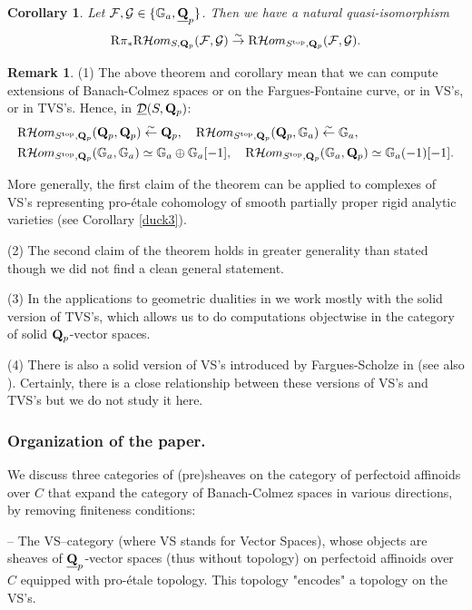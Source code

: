 \documentclass[10pt]{amsart}
\let\cal\mathcal
\newtheorem{corollary}[equation]{Corollary}
\theoremstyle{definition}
\newtheorem{remark}[equation]{Remark}
\theoremstyle{remark}
\newcommand{\Hhom}{{\cal Hom}}
\newcommand{\sff}{{\mathcal{F}}}
\newcommand{\sg}{{\mathcal{G}}}
\newcommand{\sd}{{\mathcal{D}}}
\numberwithin{equation}{section}
\def\R{{\mathrm R}}
\def\Q{{\bf Q}} \def\Z{{\bf Z}}
\numberwithin{equation}{section}
\begin{document}
\begin{corollary}
Let $\sff,\sg\in \{{\mathbb G}_a, \underline{\Q}_p\}$.  Then we have a natural quasi-isomorphism
$$
\R\pi_*\R\Hhom_{S,\Q_p}(\sff,\sg)\stackrel{\sim}{\to}\R\Hhom_{S^{\rm top},\Q_p}(\sff,\sg).
$$
\end{corollary}
\begin{remark} (1) The above theorem and corollary mean that we can compute extensions of Banach-Colmez spaces or on the Fargues-Fontaine curve, or in {\rm VS}'s, or in {\rm TVS}'s. Hence, in $\underline{\sd}(S,\Q_{p})$:
\begin{align*}
& \R\Hhom_{S^{\rm top},\Q_p}(\Q_p,\Q_p)  \stackrel{\sim}{\leftarrow}\Q_p,\quad \R\Hhom_{S^{\rm top},\Q_p}(\Q_p,{\mathbb G}_a)\stackrel{\sim}{\leftarrow}{\mathbb G}_a,\\
&  \R\Hhom_{S^{\rm top},\Q_p}({\mathbb G}_a,{\mathbb G}_a)  \simeq{\mathbb G}_a\oplus{\mathbb G}_a[-1],\quad 
  \R\Hhom_{S^{\rm top},\Q_p}({\mathbb G}_a,\Q_p)  \simeq{\mathbb G}_a(-1)[-1].
\end{align*}

More generally, the first claim of the theorem can be applied to complexes of {\rm VS}'s representing pro-\'etale cohomology of smooth partially proper rigid analytic varieties (see Corollary \ref{duck3}). 

(2) The second claim of the theorem holds in greater generality than stated  though we did not find a clean general statement. 

 (3) In the applications to geometric dualities in \cite{CGN2} we work mostly with the solid version of {\rm TVS}'s, which allows us to do computations 
objectwise in the category of solid $\Q_p$-vector spaces. 
 
 (4) There is also a solid version of {\rm VS}'s introduced by Fargues-Scholze  in \cite{FS} (see also \cite{ALBM}). Certainly, there is a close relationship between these versions of {\rm VS}'s and {\rm TVS}'s but we do not study it here. 
\end{remark}
 \subsubsection*{Organization of the paper.}  
We discuss three categories of (pre)sheaves on the category of perfectoid affinoids over $C$ that expand the
category of Banach-Colmez spaces in various directions, by removing finiteness conditions:

-- The {\rm VS}--category (where {\rm VS} stands for Vector Spaces), whose objects are sheaves of 
$\underline{\Q}_p$-vector spaces (thus without topology) on perfectoid affinoids over $C$ equipped with pro-\'etale topology. This topology "encodes" a topology on the {\rm VS}'s.
\end{document}
